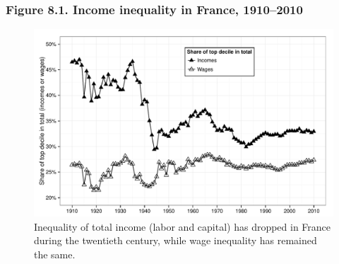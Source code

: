 \documentclass[t]{beamer}\usepackage[]{graphicx}\usepackage[]{color}
\newenvironment{knitrout}{}{} %
\begin{document}
\begin{frame}[label=Figure_8_1,fragile]
\frametitle{Figure 8.1. Income inequality in France, 1910--2010}
\begin{figure}[t]
\begin{minipage}[b]{\textwidth}
\centering
\begin{knitrout}\footnotesize
{}\color{fgcolor}

{\centering \includegraphics[width=1\linewidth]{figures/bw/Figure_8_1} 

}



\end{knitrout}
\caption{Inequality of total income (labor and capital) has dropped in France during the twentieth century, while wage inequality has remained the same.}
\end{minipage}
\end{figure}
\end{frame}
\end{document}
